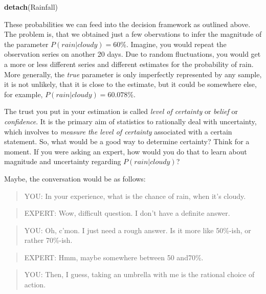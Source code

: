 \documentclass[]{svmono}
\newenvironment{Shaded}{\begin{snugshade}}{\end{snugshade}}
\newcommand{\KeywordTok}[1]{\textcolor[rgb]{0.13,0.29,0.53}{\textbf{#1}}}
\newcommand{\NormalTok}[1]{#1}
\begin{document}
\begin{Shaded}
\begin{Highlighting}[]
\KeywordTok{detach}\NormalTok{(Rainfall)}
\end{Highlighting}
\end{Shaded}

These probabilities we can feed into the decision framework as outlined
above. The problem is, that we obtained just a few obervations to infer
the magnitude of the parameter \(P(rain|cloudy) = 60\)\%. Imagine, you
would repeat the observation series on another 20 days. Due to random
fluctuations, you would get a more or less different series and
different estimates for the probability of rain. More generally, the
\emph{true} parameter is only imperfectly represented by any sample, it
is not unlikely, that it is close to the estimate, but it could be
somewhere else, for example, \(P(rain|cloudy) = 60.078\)\%.

The trust you put in your estimation is called \emph{level of certainty}
or \emph{belief} or \emph{confidence}. It is the primary aim of
statistics to rationally deal with uncertainty, which involves to
\emph{measure the level of certainty} associated with a certain
statement. So, what would be a good way to determine certainty? Think
for a moment. If you were asking an expert, how would you do that to
learn about magnitude and uncertainty regarding \(P(rain|cloudy)\)?

Maybe, the conversation would be as follows:

\begin{quote}
YOU: In your experience, what is the chance of rain, when it's cloudy.
\end{quote}

\begin{quote}
EXPERT: Wow, difficult question. I don't have a definite answer.
\end{quote}

\begin{quote}
YOU: Oh, c'mon. I just need a rough answer. Is it more like 50\%-ish, or
rather 70\%-ish.
\end{quote}

\begin{quote}
EXPERT: Hmm, maybe somewhere between 50 and70\%.
\end{quote}

\begin{quote}
YOU: Then, I guess, taking an umbrella with me is the rational choice of
action.
\end{quote}
\end{document}
